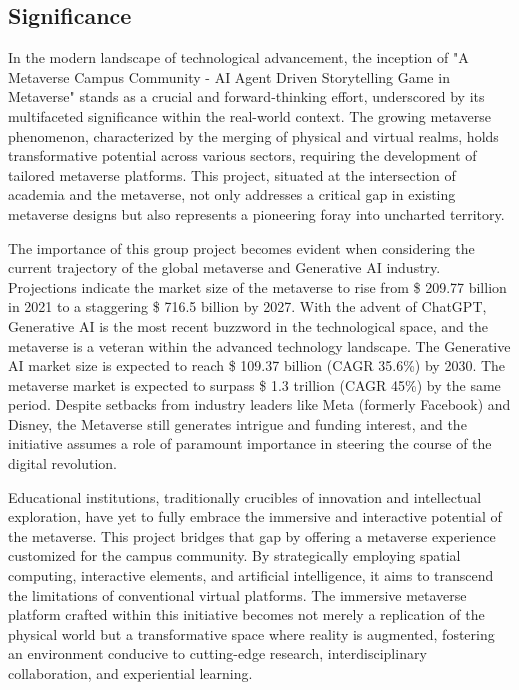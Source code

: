 
\subsection{Significance}
In the modern landscape of technological advancement, the inception of "A Metaverse Campus Community - AI Agent Driven Storytelling Game in Metaverse" stands as a crucial and forward-thinking effort, 
underscored by its multifaceted significance within the real-world context. 
The growing metaverse phenomenon, characterized by the merging of physical and virtual realms, holds transformative potential across various sectors, requiring the development of tailored metaverse platforms. 
This project, situated at the intersection of academia and the metaverse, not only addresses a critical gap in existing metaverse designs but also represents a pioneering foray into uncharted territory.

The importance of this group project becomes evident when considering the current trajectory of the global metaverse and Generative AI industry. 
Projections indicate the market size of the metaverse to rise from \$ 209.77 billion in 2021 to a staggering \$ 716.5 billion by 2027\cite{Metaverse_Market_Size}. 
With the advent of ChatGPT, Generative AI is the most recent buzzword in the technological space, and the metaverse is a veteran within the advanced technology landscape. 
The Generative AI market size is expected to reach \$ 109.37 billion (CAGR 35.6\%) by 2030. The metaverse market is expected to surpass \$ 1.3 trillion (CAGR 45\%) by the same period. 
Despite setbacks from industry leaders like Meta (formerly Facebook) and Disney, the Metaverse still generates intrigue and funding interest, and the initiative assumes a role of paramount importance in steering the course of the digital revolution\cite{Saivasan2023-am}. 

Educational institutions, traditionally crucibles of innovation and intellectual exploration, have yet to fully embrace the immersive and interactive potential of the metaverse. 
This project bridges that gap by offering a metaverse experience customized for the campus community. 
By strategically employing spatial computing, interactive elements, and artificial intelligence, it aims to transcend the limitations of conventional virtual platforms. 
The immersive metaverse platform crafted within this initiative becomes not merely a replication of the physical world but a transformative space where reality is augmented, 
fostering an environment conducive to cutting-edge research, interdisciplinary collaboration, and experiential learning.

